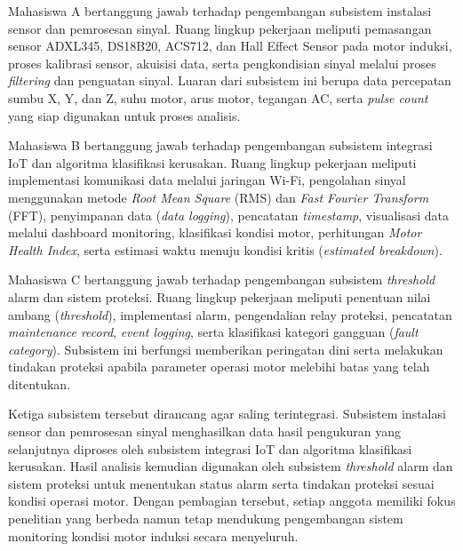\documentclass{elsinta}
\begin{document}
Mahasiswa A bertanggung jawab terhadap pengembangan subsistem instalasi sensor dan pemrosesan sinyal. Ruang lingkup pekerjaan meliputi pemasangan sensor ADXL345, DS18B20, ACS712, dan Hall Effect Sensor pada motor induksi, proses kalibrasi sensor, akuisisi data, serta pengkondisian sinyal melalui proses \textit{filtering} dan penguatan sinyal. Luaran dari subsistem ini berupa data percepatan sumbu X, Y, dan Z, suhu motor, arus motor, tegangan AC, serta \textit{pulse count} yang siap digunakan untuk proses analisis.

Mahasiswa B bertanggung jawab terhadap pengembangan subsistem integrasi IoT dan algoritma klasifikasi kerusakan. Ruang lingkup pekerjaan meliputi implementasi komunikasi data melalui jaringan Wi-Fi, pengolahan sinyal menggunakan metode \textit{Root Mean Square} (RMS) dan \textit{Fast Fourier Transform} (FFT), penyimpanan data (\textit{data logging}), pencatatan \textit{timestamp}, visualisasi data melalui dashboard monitoring, klasifikasi kondisi motor, perhitungan \textit{Motor Health Index}, serta estimasi waktu menuju kondisi kritis (\textit{estimated breakdown}).

Mahasiswa C bertanggung jawab terhadap pengembangan subsistem \textit{threshold} alarm dan sistem proteksi. Ruang lingkup pekerjaan meliputi penentuan nilai ambang (\textit{threshold}), implementasi alarm, pengendalian relay proteksi, pencatatan \textit{maintenance record}, \textit{event logging}, serta klasifikasi kategori gangguan (\textit{fault category}). Subsistem ini berfungsi memberikan peringatan dini serta melakukan tindakan proteksi apabila parameter operasi motor melebihi batas yang telah ditentukan.

Ketiga subsistem tersebut dirancang agar saling terintegrasi. Subsistem instalasi sensor dan pemrosesan sinyal menghasilkan data hasil pengukuran yang selanjutnya diproses oleh subsistem integrasi IoT dan algoritma klasifikasi kerusakan. Hasil analisis kemudian digunakan oleh subsistem \textit{threshold} alarm dan sistem proteksi untuk menentukan status alarm serta tindakan proteksi sesuai kondisi operasi motor. Dengan pembagian tersebut, setiap anggota memiliki fokus penelitian yang berbeda namun tetap mendukung pengembangan sistem monitoring kondisi motor induksi secara menyeluruh.



\subsection{\SystemTestingTitle}
\end{document}

